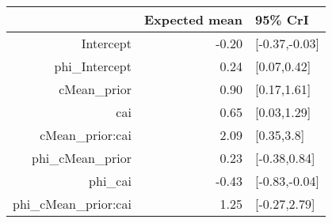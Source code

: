 \begin{tabular}{rrl}
  \hline
 & Expected mean & 95\% CrI \\ 
  \hline
Intercept & -0.20 & [-0.37,-0.03] \\ 
  phi\_Intercept & 0.24 & [0.07,0.42] \\ 
  cMean\_prior & 0.90 & [0.17,1.61] \\ 
  cai & 0.65 & [0.03,1.29] \\ 
  cMean\_prior:cai & 2.09 & [0.35,3.8] \\ 
  phi\_cMean\_prior & 0.23 & [-0.38,0.84] \\ 
  phi\_cai & -0.43 & [-0.83,-0.04] \\ 
  phi\_cMean\_prior:cai & 1.25 & [-0.27,2.79] \\ 
   \hline
\end{tabular}

